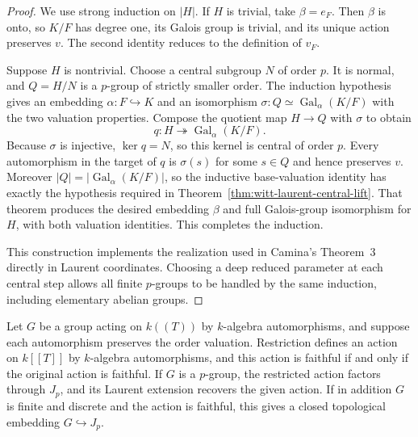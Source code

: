 \begin{proof}
We use strong induction on $|H|$. If $H$ is trivial, take
$\beta=e_F$. Then $\beta$ is onto, so $K/F$ has degree one,
its Galois group is trivial, and its unique action preserves $v$.
The second identity reduces to the definition of $v_F$.

Suppose $H$ is nontrivial. Choose a central subgroup $N$ of
order $p$. It is normal, and $Q=H/N$ is a $p$-group of strictly
smaller order. The induction hypothesis gives an embedding
$\alpha:F\hookrightarrow K$ and an isomorphism
$\sigma:Q\simeq\operatorname{Gal}_{\alpha}(K/F)$ with the two
valuation properties. Compose the quotient map $H\to Q$ with
$\sigma$ to obtain
\[
 q:H\twoheadrightarrow\operatorname{Gal}_{\alpha}(K/F).
\]
Because $\sigma$ is injective, $\ker q=N$, so this kernel is
central of order $p$. Every automorphism in the target of $q$
is $\sigma(s)$ for some $s\in Q$ and hence preserves $v$.
Moreover $|Q|=|\operatorname{Gal}_{\alpha}(K/F)|$, so the
inductive base-valuation identity has exactly the hypothesis
required in Theorem~\ref{thm:witt-laurent-central-lift}.
That theorem produces the desired embedding $\beta$ and full
Galois-group isomorphism for $H$, with both valuation identities.
This completes the induction.

This construction implements the realization used in Camina's
Theorem~3 directly in Laurent coordinates. Choosing a deep reduced
parameter at each central step allows all finite $p$-groups to be
handled by the same induction, including elementary abelian groups.
\end{proof}

\begin{lemma}
\label{lem:laurent-action-nottingham-restriction}
\leanok
Let $G$ be a group acting on $k((T))$ by $k$-algebra automorphisms,
and suppose each automorphism preserves the order valuation.
Restriction defines an action on $k[[T]]$ by $k$-algebra
automorphisms, and this action is faithful if and only if the
original action is faithful. If $G$ is a $p$-group, the restricted
action factors through $J_p$, and its Laurent extension recovers
the given action. If in addition $G$ is finite and discrete and
the action is faithful, this gives a closed topological embedding
$G\hookrightarrow J_p$.
\end{lemma}


